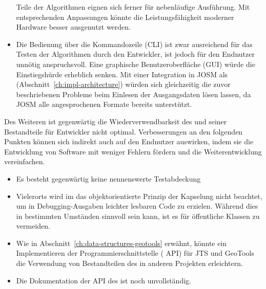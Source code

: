 \documentclass[../main/thesis.tex]{subfiles}
\begin{document}
\begin{itemize}

Teile der Algorithmen eignen sich ferner für nebenläufige Ausführung.
Mit entsprechenden Anpassungen könnte die Leistungsfähigkeit moderner Hardware besser ausgenutzt werden.

\item
Die Bedienung über die Kommandozeile (CLI) ist zwar ausreichend für das Testen der Algorithmen durch den Entwickler, ist jedoch für den Endnutzer unnötig anspruchsvoll.
Eine graphische Benutzeroberfläche (GUI) würde die Einstiegshürde erheblich senken.
Mit einer Integration in JOSM als  (Abschnitt~\ref{ch:impl-architecture}) würden sich gleichzeitig die zuvor beschriebenen Probleme beim Einlesen der Ausgangsdaten lösen lassen, da JOSM alle angesprochenen Formate bereits unterstützt.

\end{itemize}

Des Weiteren ist gegenwärtig die Wiederverwendbarkeit des  und seiner Bestandteile für Entwickler nicht optimal.
Verbesserungen an den folgenden Punkten können sich indirekt auch auf den Endnutzer auswirken, indem sie die Entwicklung von Software mit weniger Fehlern fördern und die Weiterentwicklung vereinfachen.
%
\begin{itemize}

\item
Es besteht gegenwärtig keine nennenswerte Testabdeckung 

\item
Vielerorts wird im  das objektorientierte Prinzip der Kapselung nicht beachtet, um in Debugging-Ausgaben leichter lesbaren Code zu erzielen.
Während dies in bestimmten Umständen sinnvoll sein kann, ist es für öffentliche Klassen zu vermeiden. 

\item
Wie in Abschnitt~\ref{ch:data-structures-geotools} erwähnt, könnte ein Implementieren der Programmierschnittstelle ( API) für JTS und GeoTools die Verwendung von Bestandteilen des  in anderen Projekten erleichtern.

\item
Die Dokumentation der API des  ist noch unvollständig.

\end{itemize}
\end{document}
